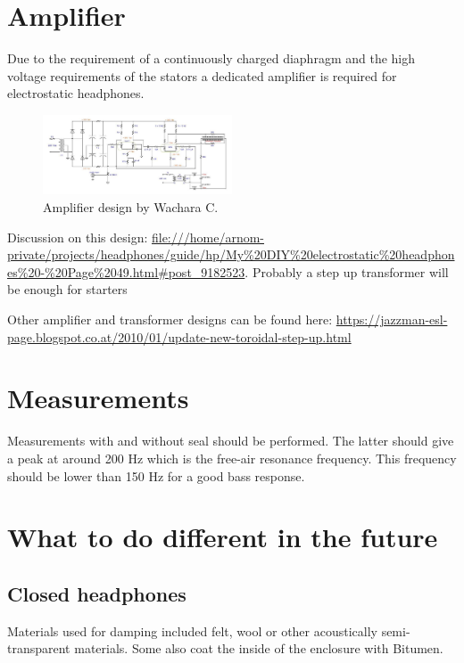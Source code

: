 \documentclass{article}
\begin{document}
\section{Amplifier}
\label{s:amp}
Due to the requirement of a continuously charged diaphragm and the high voltage requirements of the stators a dedicated amplifier is required for electrostatic headphones.
\begin{figure}[htb]
    \centering
    \includegraphics[width=0.5\textwidth]{images/wachara-amp.png}
    \caption{Amplifier design by Wachara C.}
    \label{f:amp:wachara}
\end{figure}
Discussion on this design: \url{file:///home/arnom-private/projects/headphones/guide/hp/My\%20DIY\%20electrostatic\%20headphones\%20-\%20Page\%2049.html#post_9182523}. Probably a step up transformer will be enough for starters

Other amplifier and transformer designs can be found here: \url{https://jazzman-esl-page.blogspot.co.at/2010/01/update-new-toroidal-step-up.html}

\section{Measurements}
\label{s:measurements}

Measurements with and without seal should be performed. The latter should give a peak at around 200 Hz which is the free-air resonance frequency. This frequency should be lower than 150 Hz for a good bass response.

\section{What to do different in the future}
\label{s:future}

\subsection{Closed headphones}
\label{s:future:closed}
Materials used for damping included felt, wool or other acoustically semi-transparent materials. Some also coat the inside of the enclosure with Bitumen.




\end{document}
